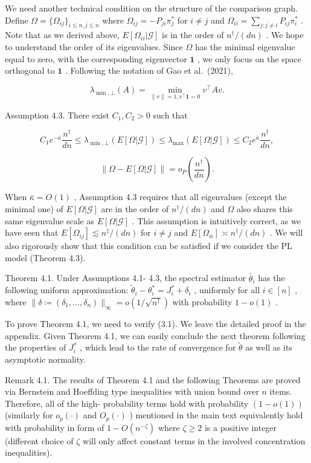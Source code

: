 We need another technical condition on the structure of the comparison
graph. Define \(\Omega = \{\Omega_{ij}\}_{i\leq n,j\leq n}\) where
\(\Omega_{ij} = - P_{ji}\pi_j^*\) for \(i\neq j\) and
\(\Omega_{ii} = \sum_{j:j\neq i}P_{ij}\pi_i^*\) . Note that as we
derived above, \(E[\Omega_{ii}|\mathcal{G}]\) is in the order of
\(n^{\dagger} / (dn)\) . We hope to understand the order of its
eigenvalues. Since \(\Omega\) has the minimal eigenvalue equal to zero,
with the corresponding eigenvector \(\mathbf{1}\) , we only focus on the
space orthogonal to \(\mathbf{1}\) . Following the notation of Gao et
al.~(2021),

\[
\lambda_{\min ,\bot}(A) = \min_{\| v\| = 1,v^{\top}\mathbf{1} = 0}v^{\top}A v.
\]

Assumption 4.3. There exist \(C_1,C_2 > 0\) such that

\[
C_1e^{-\bar{\kappa}}\frac{n^\dagger}{dn}\leq \lambda_{\min ,\bot}(E[\Omega |\mathcal{G}])\leq \lambda_{\max}(E[\Omega |\mathcal{G}])\leq C_2e^{\bar{\kappa}}\frac{n^\dagger}{dn}, \tag{4.1}
\]

\[
\| \Omega -E[\Omega |\mathcal{G}]\| = o_{P}\left(\frac{n^{\dagger}}{dn}\right). \tag{4.2}
\]

When \(\bar{\kappa} = O(1)\) , Assumption 4.3 requires that all
eigenvalues (except the minimal one) of \(E[\Omega |\mathcal{G}]\) are
in the order of \(n^{\dagger} / (dn)\) and \(\Omega\) also shares this
same eigenvalue scale as \(E[\Omega |\mathcal{G}]\) . This assumption is
intuitively correct, as we have seen that
\(E[\Omega_{ij}]\lesssim n^{\ddagger} / (dn)\) for \(i\neq j\) and
\(E[\Omega_{ii}]\asymp n^{\dagger} / (dn)\) . We will also rigorously
show that this condition can be satisfied if we consider the PL model
(Theorem 4.3).

Theorem 4.1. Under Assumptions 4.1- 4.3, the spectral estimator
\(\widetilde{\theta_{i}}\) has the following uniform approximation:
\(\widetilde{\theta}_{i} - \theta_{i}^{*} = J_{i}^{*} + \delta_{i}\) ,
uniformly for all \(i\in [n]\) , where
\(\| \delta \coloneqq (\delta_{1},\dots ,\delta_{n})\|_{\infty} = o(1 / \sqrt{n^{\dagger}})\)
with probability \(1 - o(1)\) .

To prove Theorem 4.1, we need to verify (3.1). We leave the detailed
proof in the appendix. Given Theorem 4.1, we can easily conclude the
next theorem following the properties of \(J_{i}^{*}\) , which lead to
the rate of convergence for \(\widetilde{\theta}\) as well as its
asymptotic normality.

Remark 4.1. The results of Theorem 4.1 and the following Theorems are
proved via Bernstein and Hoeffding type inequalities with union bound
over \(n\) items. Therefore, all of the high- probability terms hold
with probability \((1 - o(1))\) (similarly for \(o_{p}(\cdot)\) and
\(O_{p}(\cdot)\) ) mentioned in the main text equivalently hold with
probability in form of \(1 - O(n^{- \zeta})\) where \(\zeta \geq 2\) is
a positive integer (different choice of \(\zeta\) will only affect
constant terms in the involved concentration inequalities).

